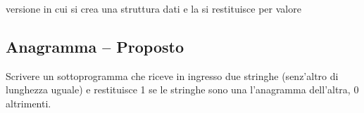 
versione in cui si crea una struttura dati e la si restituisce per valore


\prosep{}

\subsection{Anagramma -- Proposto}
Scrivere un sottoprogramma che riceve in ingresso due stringhe (senz'altro di lunghezza uguale) e
restituisce 1 se le stringhe sono una l'anagramma dell'altra, 0 altrimenti.

